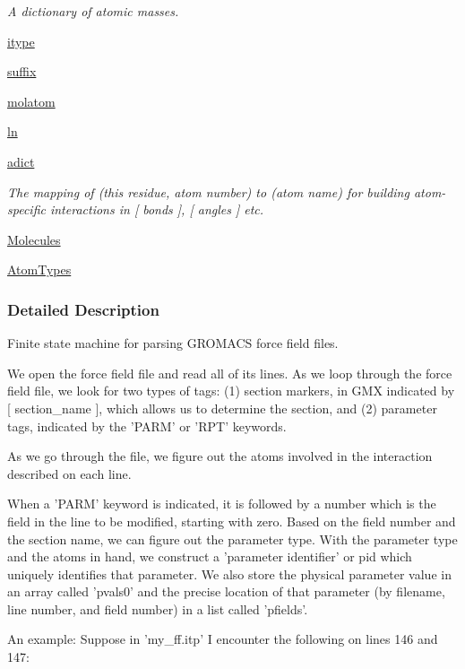 \begin{DoxyCompactItemize}
\begin{DoxyCompactList}\small\item\em A dictionary of atomic masses. \end{DoxyCompactList}\item 
\hyperlink{classforcebalance_1_1gmxio_1_1ITP__Reader_a1809bf22503b8647f48ea37c9f6f4cee}{itype}
\item 
\hyperlink{classforcebalance_1_1gmxio_1_1ITP__Reader_a147438dd2683af88b92b659c96162848}{suffix}
\item 
\hyperlink{classforcebalance_1_1gmxio_1_1ITP__Reader_ad22477e12597eceeceedeb327d723094}{molatom}
\item 
\hyperlink{classforcebalance_1_1basereader_1_1BaseReader_ab04436f3968d9bd6ec09238ee6537ec6}{ln}
\item 
\hyperlink{classforcebalance_1_1basereader_1_1BaseReader_a84a513e0e43145b2fdaf38e73c32f83a}{adict}
\begin{DoxyCompactList}\small\item\em The mapping of (this residue, atom number) to (atom name) for building atom-\/specific interactions in \mbox{[} bonds \mbox{]}, \mbox{[} angles \mbox{]} etc. \end{DoxyCompactList}\item 
\hyperlink{classforcebalance_1_1basereader_1_1BaseReader_ad2842550aa690f1cd82e41ec8d6fe541}{Molecules}
\item 
\hyperlink{classforcebalance_1_1basereader_1_1BaseReader_ad5765e192499937376950410364014af}{Atom\-Types}
\end{DoxyCompactItemize}


\subsubsection{Detailed Description}
Finite state machine for parsing G\-R\-O\-M\-A\-C\-S force field files. 

\begin{DoxyVerb} We open the force field file and read all of its lines.  As we loop
 through the force field file, we look for two types of tags: (1) section
 markers, in GMX indicated by [ section_name ], which allows us to determine
 the section, and (2) parameter tags, indicated by the 'PARM' or 'RPT' keywords.

 As we go through the file, we figure out the atoms involved in the interaction
 described on each line.

 When a 'PARM' keyword is indicated, it is followed by a number which is the field
 in the line to be modified, starting with zero.  Based on the field number and the
 section name, we can figure out the parameter type.  With the parameter type
 and the atoms in hand, we construct a 'parameter identifier' or pid which uniquely
 identifies that parameter.  We also store the physical parameter value in an array
 called 'pvals0' and the precise location of that parameter (by filename, line number,
 and field number) in a list called 'pfields'.

 An example: Suppose in 'my_ff.itp' I encounter the following on lines 146 and 147:
\end{DoxyVerb}



